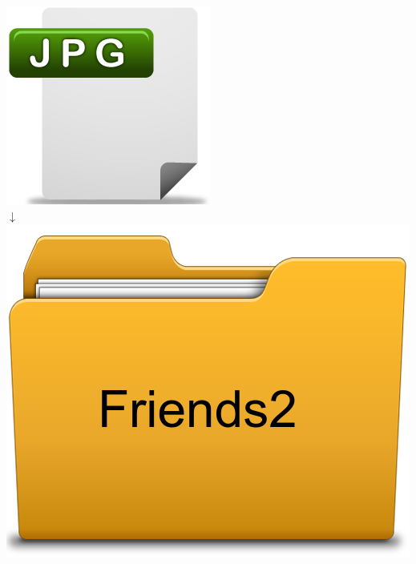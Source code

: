 \documentclass{beamer}
\begin{document}
\begin{frame}
\begin{columns}[t]
     \begin{column}[T]{3cm}
     \begin{center}
     \includegraphics[scale=0.2]{images/file/jpgicon.png} \\
     $\boldsymbol{\downarrow}$ \\
     \includegraphics[scale=0.15]{images/folder/friends2}
     \end{center}
     \end{column}
     

\end{columns}
\end{frame}
\end{document}
